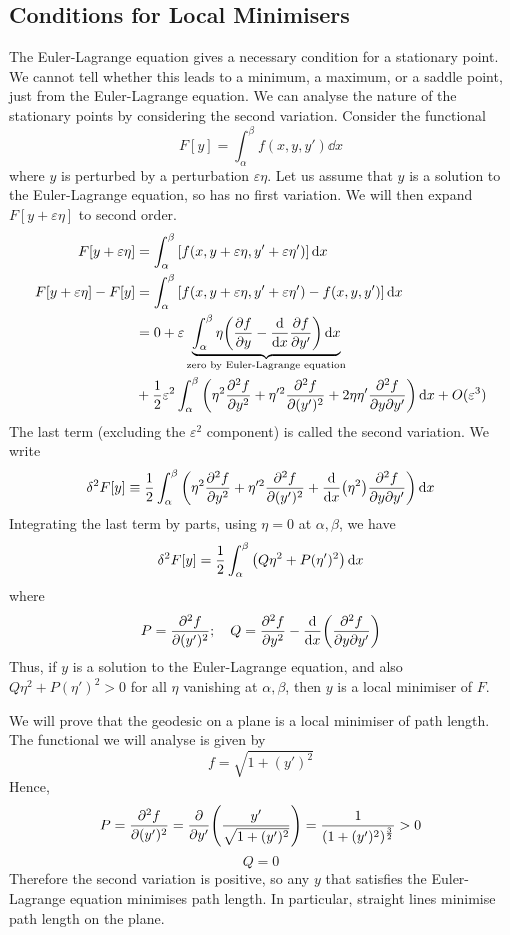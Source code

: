 \subsection{Conditions for Local Minimisers}
The Euler-Lagrange equation gives a necessary condition for a stationary point.
We cannot tell whether this leads to a minimum, a maximum, or a saddle point, just from the Euler-Lagrange equation.
We can analyse the nature of the stationary points by considering the second variation.
Consider the functional
\[
	F[y] = \int_\alpha^\beta f(x,y,y') \dd{x}
\]
where \( y \) is perturbed by a perturbation \( \varepsilon\eta \).
Let us assume that \( y \) is a solution to the Euler-Lagrange equation, so has no first variation.
We will then expand \( F[y+\varepsilon\eta] \) to second order.
\begin{align*}
	F[y+\varepsilon\eta]        & = \int_\alpha^\beta \qty[f(x,y+\varepsilon\eta,y'+\varepsilon\eta')] \dd{x}                                                                                  \\
	F[y+\varepsilon\eta] - F[y] & = \int_\alpha^\beta \qty[f(x,y+\varepsilon\eta,y'+\varepsilon\eta') - f(x,y,y')] \dd{x}                                                                      \\
	                            & = 0 + \varepsilon \underbrace{\int_\alpha^\beta \eta \qty( \pdv{f}{y} - \dv{x} \pdv{f}{y'} ) \dd{x}}_{\text{zero by Euler-Lagrange equation}}                \\
	                            & + \frac{1}{2} \varepsilon^2 \int_\alpha^\beta  \qty( \eta^2 \pdv[2]{f}{y} + \eta'^2 \pdv[2]{f}{(y')} + 2\eta\eta' \pdv{f}{y}{y'} ) \dd{x} + O(\varepsilon^3)
\end{align*}
The last term (excluding the \( \varepsilon^2 \) component) is called the second variation.
We write
\[
	\delta^2 F[y] \equiv \frac{1}{2}\int_\alpha^\beta \qty( \eta^2 \pdv[2]{f}{y} + \eta'^2 \pdv[2]{f}{(y')} + \dv{x} (\eta^2) \pdv{f}{y}{y'} ) \dd{x}
\]
Integrating the last term by parts, using \( \eta = 0 \) at \( \alpha, \beta \), we have
\[
	\delta^2 F[y] = \frac{1}{2}\int_\alpha^\beta \qty( Q\eta^2 + P(\eta')^2 ) \dd{x}
\]
where
\[
	P = \pdv[2]{f}{(y')};\quad Q = \pdv[2]{f}{y} - \dv{x} \qty(\pdv{f}{y}{y'})
\]
Thus, if \( y \) is a solution to the Euler-Lagrange equation, and also \( Q\eta^2 + P(\eta')^2 > 0 \) for all \( \eta \) vanishing at \( \alpha, \beta \), then \( y \) is a local minimiser of \( F \).

\begin{example}
	We will prove that the geodesic on a plane is a local minimiser of path length.
	The functional we will analyse is given by
	\[
		f = \sqrt{1 + (y')^2}
	\]
	Hence,
	\[
		P = \pdv[2]{f}{(y')} = \pdv{y'} \qty(\frac{y'}{\sqrt{1+(y')^2}}) = \frac{1}{(1+(y')^2)^{\frac{3}{2}}} > 0
	\]
	\[
		Q = 0
	\]
	Therefore the second variation is positive, so any \( y \) that satisfies the Euler-Lagrange equation minimises path length.
	In particular, straight lines minimise path length on the plane.
\end{example}

